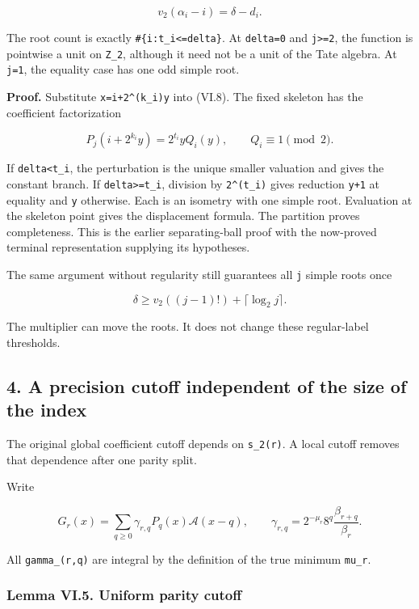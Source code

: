 \documentclass[11pt,letterpaper]{article}
\begin{document}
\[
v_2(\alpha_i-i)=\delta-d_i.
\]

The root count is exactly \texttt{\#\{i:t\_i\textless{}=delta\}}. At \texttt{delta=0} and \texttt{j\textgreater{}=2}, the function is pointwise a unit on \texttt{Z\_2}, although it need not be a unit of the Tate algebra. At \texttt{j=1}, the equality case has one odd simple root.

\textbf{Proof.} Substitute \texttt{x=i+2\^{}(k\_i)y} into (VI.8). The fixed skeleton has the coefficient factorization

\[
P_j(i+2^{k_i}y)=2^{t_i}yQ_i(y),\qquad Q_i\equiv1\pmod2.
\]

If \texttt{delta\textless{}t\_i}, the perturbation is the unique smaller valuation and gives the constant branch. If \texttt{delta\textgreater{}=t\_i}, division by \texttt{2\^{}(t\_i)} gives reduction \texttt{y+1} at equality and \texttt{y} otherwise. Each is an isometry with one simple root. Evaluation at the skeleton point gives the displacement formula. The partition proves completeness. This is the earlier separating-ball proof with the now-proved terminal representation supplying its hypotheses.

The same argument without regularity still guarantees all \texttt{j} simple roots once

\[
\boxed{\delta\ge v_2((j-1)!)+\lceil\log_2j\rceil.} \tag{VI.10}
\]

The multiplier can move the roots. It does not change these regular-label thresholds.

\subsection{4. A precision cutoff independent of the size of the index}\label{a-precision-cutoff-independent-of-the-size-of-the-index}

The original global coefficient cutoff depends on \texttt{s\_2(r)}. A local cutoff removes that dependence after one parity split.

Write

\[
G_r(x)=\sum_{q\ge0}\gamma_{r,q}P_q(x)\mathscr A(x-q),
\qquad
\gamma_{r,q}=2^{-\mu_r}8^q\frac{\beta_{r+q}}{\beta_r}.
\]

All \texttt{gamma\_(r,q)} are integral by the definition of the true minimum \texttt{mu\_r}.

\subsubsection{Lemma VI.5. Uniform parity cutoff}\label{lemma-vi.5.-uniform-parity-cutoff}
\end{document}
